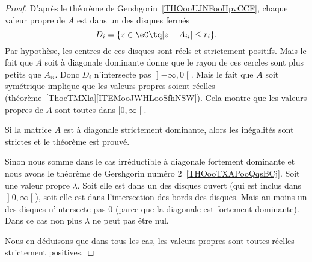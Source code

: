 \begin{proof}
	D'après le théorème de Gershgorin~\ref{THOooUJNFooHpvCCF}, chaque valeur propre de \( A\) est dans un des disques fermés
	\begin{equation}
		D_i=\{ z\in \eC\tq | z-A_{ii} |\leq r_i \}.
	\end{equation}
	Par hypothèse, les centres de ces disques sont réels et strictement positifs. Mais le fait que \( A\) soit à diagonale dominante donne que le rayon de ces cercles sont plus petits que \( A_{ii}\). Donc \( D_i\) n'intersecte pas \( \mathopen] -\infty , 0 \mathclose[\). Mais le fait que \( A\) soit symétrique implique que les valeurs propres soient réelles (théorème~\ref{ThoeTMXla}\ref{ITEMooJWHLooSfhNSW}). Cela montre que les valeurs propres de \( A\) sont toutes dans \( \mathopen[ 0 , \infty \mathclose[\).

		Si la matrice \( A\) est à diagonale strictement dominante, alors les inégalités sont strictes et le théorème est prouvé.

		Sinon nous somme dans le cas irréductible à diagonale fortement dominante et nous avons le théorème de Gershgorin numéro 2~\ref{THOooTXAPooQqsBCj}. Soit une valeur propre \( \lambda\). Soit elle est dans un des disques ouvert (qui est inclus dans \( \mathopen] 0 , \infty \mathclose[\)), soit elle est dans l'intersection des bords des disques. Mais au moins un des disques n'intersecte pas \( 0\) (parce que la diagonale est fortement dominante). Dans ce cas non plus \( \lambda\) ne peut pas être nul.

	Nous en déduisons que dans tous les cas, les valeurs propres sont toutes réelles strictement positives.
\end{proof}
